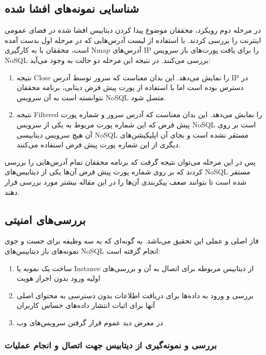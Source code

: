 \documentclass[10pt, a4paper]{article}
\begin{document}
\subsection{شناسایی نمونه‌های افشا شده}

در مرحله دوم رویکرد، محققان موضوع پیدا کردن دیتابیس افشا شده در فضای عمومی
اینترنت را بررسی کردند. با استفاده از لیست آدرس‌هایی که در مرحله اول بدست آمده
است، محققان با به کارگیری Nmap آدرس‌های IP را برای یافت پورت‌های باز سرویس NoSQL
بررسی می‌کنند. در نتیجه این مرحله دو حالت به وجود می‌آید:

\begin{enumerate}
    \item نتیجه Close را نمایش می‌دهد. این بدان معناست که سرور توسط آدرس IP در
    دسترس بوده است اما با استفاده از پورت پیش فرض دیتابی، برنامه محققان نتوانسته
    است به آن سرویس NoSQL متصل شود.
    \item نتیجه Filtered را نمایش می‌دهد. این بدان معناست که آدرس سرور و شماره
    پورت پیش فرض که این شماره پورت مربوط به یکی از سرویس NoSQL است بر روی آن هیچ
    سرویس دیتابیسی NoSQL مستقر نشده است و بجای آن اپلیکیشن‌های دیگری از این
    شماره پورت پیش فرض استفاده می‌کنند.
\end{enumerate}

پس در این مرحله می‌توان نتیجه گرفت که برنامه محققان تمام آدرس‌هایی را بررسی
کردند که بر روی شماره پورت پیش فرض آن‌ها یکی از دیتابیس‌های NoSQL مستقر شده است
تا بتوانند ضعف پیکربندی آن‌ها را در این مقاله بیشتر مورد بررسی قرار دهند.

\subsection{بررسی‌های امنیتی}

فاز اصلی و عملی این تحقیق می‌باشد. به گونه‌ای که به سه وظیفه برای جست و جوی
نمونه‌های باز دیتابیس‌های NoSQL انجام گرفته است:

\begin{enumerate}
    \item ساخت یک نمونه یا Instance از دیتابیس مربوطه برای اتصال به آن و
    بررسی‌های اولیه ورود بدون احراز هویت
    \item بررسی و ورود به داده‌ها برای دریافت اطلاعات بدون دسترسی به محتوای اصلی
    آنها برای اثبات انتشار داده‌های حساس کاربران
    \item در معرض دید عموم قرار گرفتن سرویس‌های وب
\end{enumerate}


\subsubsection*{بررسی و نمونه‌گیری از دیتابیس جهت اتصال و انجام عملیات}
\end{document}
